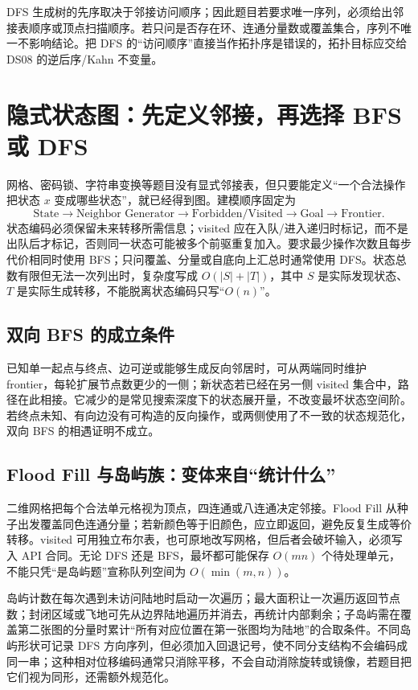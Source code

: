 \documentclass[UTF8,fontset=none,11pt,a4paper]{ctexart}
\begin{document}
DFS 生成树的先序取决于邻接访问顺序；因此题目若要求唯一序列，必须给出邻接表顺序或顶点扫描顺序。若只问是否存在环、连通分量数或覆盖集合，序列不唯一不影响结论。把 DFS 的“访问顺序”直接当作拓扑序是错误的，拓扑目标应交给 DS08 的逆后序/Kahn 不变量。

\section{隐式状态图：先定义邻接，再选择 BFS 或 DFS}
网格、密码锁、字符串变换等题目没有显式邻接表，但只要能定义“一个合法操作把状态 $x$ 变成哪些状态”，就已经得到图。建模顺序固定为
\[
\text{State}\to\text{Neighbor Generator}\to\text{Forbidden/Visited}\to\text{Goal}\to\text{Frontier}.
\]
状态编码必须保留未来转移所需信息；visited 应在入队/进入递归时标记，而不是出队后才标记，否则同一状态可能被多个前驱重复加入。要求最少操作次数且每步代价相同时使用 BFS；只问覆盖、分量或自底向上汇总时通常使用 DFS。状态总数有限但无法一次列出时，复杂度写成 $O(|S|+|T|)$，其中 $S$ 是实际发现状态、$T$ 是实际生成转移，不能脱离状态编码只写“$O(n)$”。

\subsection{双向 BFS 的成立条件}
已知单一起点与终点、边可逆或能够生成反向邻居时，可从两端同时维护 frontier，每轮扩展节点数更少的一侧；新状态若已经在另一侧 visited 集合中，路径在此相接。它减少的是常见搜索深度下的状态展开量，不改变最坏状态空间阶。若终点未知、有向边没有可构造的反向操作，或两侧使用了不一致的状态规范化，双向 BFS 的相遇证明不成立。

\subsection{Flood Fill 与岛屿族：变体来自“统计什么”}
二维网格把每个合法单元格视为顶点，四连通或八连通决定邻接。Flood Fill 从种子出发覆盖同色连通分量；若新颜色等于旧颜色，应立即返回，避免反复生成等价转移。visited 可用独立布尔表，也可原地改写网格，但后者会破坏输入，必须写入 API 合同。无论 DFS 还是 BFS，最坏都可能保存 $O(mn)$ 个待处理单元，不能只凭“是岛屿题”宣称队列空间为 $O(\min(m,n))$。

岛屿计数在每次遇到未访问陆地时启动一次遍历；最大面积让一次遍历返回节点数；封闭区域或飞地可先从边界陆地遍历并消去，再统计内部剩余；子岛屿需在覆盖第二张图的分量时累计“所有对应位置在第一张图均为陆地”的合取条件。不同岛屿形状可记录 DFS 方向序列，但必须加入回退记号，使不同分支结构不会编码成同一串；这种相对位移编码通常只消除平移，不会自动消除旋转或镜像，若题目把它们视为同形，还需额外规范化。
\end{document}
